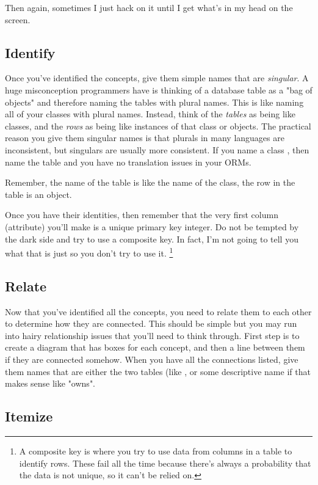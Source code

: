 Then again, sometimes I just hack on it until I get what's in my head on the screen.

\subsection{Identify}

Once you've identified the concepts, give them simple names that are \emph{singular}.  A huge
misconception programmers have is thinking of a database table as a "bag of objects" and therefore
naming the tables with plural names.  This is like naming all of your classes with plural names.
Instead, think of the \emph{tables} as being like classes, and the \emph{rows} as being like
instances of that class or objects.  The practical reason you give them singular names is that
plurals in many languages are inconsistent, but singulars are usually more consistent.  If you
name a class , then name the table  and you have no translation
issues in your ORMs.

Remember, the name of the table is like the name of the class, the row in the table is an
object.

Once you have their identities, then remember that the very first column
(attribute) you'll make is a unique primary key integer.  Do not be tempted by
the dark side and try to use a composite key.  In fact, I'm not going to tell
you what that is just so you don't try to use it.  \footnote{A composite key is
    where you try to use data from columns in a table to identify rows.  These
        fail all the time because there's always a probability that the data is
        not unique, so it can't be relied on.}

\subsection{Relate}

Now that you've identified all the concepts, you need to relate them to each
other to determine how they are connected.  This should be simple but you may
run into hairy relationship issues that you'll need to think through.  First
step is to create a diagram that has boxes for each concept, and then a line
between them if they are connected somehow.  When you have all the connections
listed, give them names that are either the two tables (like
, or some descriptive name if that makes sense like
"owns".

\subsection{Itemize}

